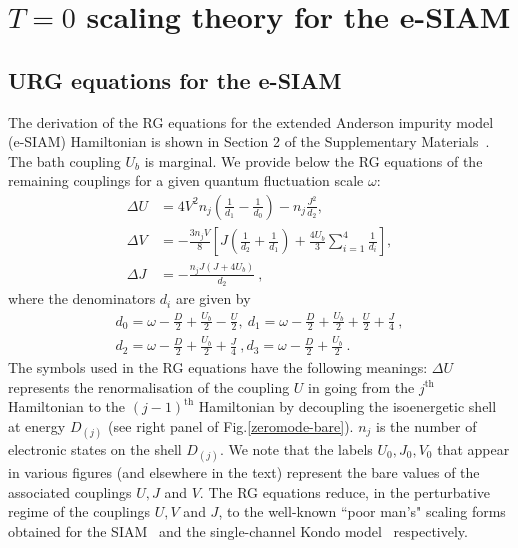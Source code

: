\documentclass{iopart}
\begin{document}
\section{\(T=0\) scaling theory for the e-SIAM}
\label{urg-theory}

\subsection{URG equations for the e-SIAM}

The derivation of the RG equations for the extended Anderson impurity model (e-SIAM) Hamiltonian is shown in Section 2 of the Supplementary Materials~\cite{supp_mat}. The bath coupling \(U_b\) is marginal. We provide below the RG equations of the remaining couplings for a given quantum fluctuation scale \(\omega\):
\begin{align}
	\Delta U &= 4V^2 n_j\left(\frac{1}{d_1} - \frac{1}{d_0}\right) - n_j\frac{J^2}{d_2},\nonumber\\
	\Delta V &= -\frac{3n_j V}{8}\left[J\left(\frac{1}{d_2} + \frac{1}{d_1}\right) +  \frac{4U_b}{3}\sum_{i=1}^4 \frac{1}{d_i}\right],\label{rg-eqn}\\
	\Delta J &= -\frac{n_j J\left(J + 4U_b\right)}{d_2}~,\nonumber
\end{align}
where the denominators \(d_i\) are given by
\begin{eqnarray}\label{rg-eqtn1}
	d_0 = \omega - \frac{D}{2} + \frac{U_b}{2} - \frac{U}{2},~d_1 = \omega - \frac{D}{2} + \frac{U_b}{2} + \frac{U}{2} + \frac{J}{4}~,\\
	d_2 = \omega - \frac{D}{2} + \frac{U_b}{2} + \frac{J}{4}~,d_3 = \omega - \frac{D}{2} + \frac{U_b}{2}~.
\end{eqnarray}
The symbols used in the RG equations have the following meanings: \(\Delta U\) represents the renormalisation of the coupling \(U\) in going from the \(j^\text{th}\) Hamiltonian to the \(\left( j-1 \right) ^\text{th}\) Hamiltonian by decoupling the isoenergetic shell at energy \(D_{(j)}\) (see right panel of Fig.\eqref{zeromode-bare}). \(n_j\) is the number of electronic states on the shell \(D_{(j)}\). We note that the labels \(U_0,J_0,V_0\) that appear in various figures (and elsewhere in the text) represent the bare values of the associated couplings \(U,J\) and \(V\). The RG equations reduce, in the perturbative regime of the couplings $U, V$ and $J$, to the well-known ``poor man's" scaling forms obtained for the  SIAM~\cite{haldane1978scaling} and the single-channel Kondo model~\cite{anderson1970} respectively.
\end{document}
